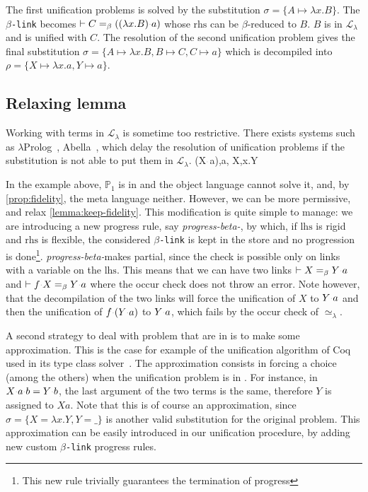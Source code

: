 \documentclass[sigconf,natbib=false,review]{acmart}
\newcommand{\appsep}{\ensuremath{\textcolor{lightgray}{\cdot}}}
\newcommand{\UnifRel}{\ensuremath{\simeq}}
\newcommand{\Ue}{\ensuremath{\UnifRel_\lambda}\xspace}
\newcommand{\llambda}{\ensuremath{\mathcal{L}_\lambda}\xspace}
\newcommand{\linkMacro}[1]{\ensuremath{#1}\texttt{-link}\xspace}
\newcommand{\linkbeta}{\linkMacro{\beta}}
\newcommand{\linkbetaM}[3]{\ensuremath{#1 \vdash #2 =_\beta #3}}
\newcommand{\lhs}{\ensuremath{\mathrm{lhs}}\xspace}
\newcommand{\rhs}{\ensuremath{\mathrm{rhs}}\xspace}
\newcommand{\foUnifPb}{\ensuremath{\mathbb{P}}\xspace}
\begin{document}
The first unification problems is solved by the substitution $\sigma = \{A
\mapsto \lambda x.B\}$. The \linkbeta becomes
\linkbetaM{}{C}{((\lambda x.B) \appsep a)} whose \rhs can be $\beta$-reduced to
$B$. $B$ is in \llambda and is unified with $C$. The resolution of the second
unification problem
gives the final substitution $\sigma = \{A \mapsto \lambda x.B, B \mapsto C, C
\mapsto a\}$ which is decompiled into $\rho = \{X \mapsto \lambda x.a, Y \mapsto
a\}$.
 
\subsection{Relaxing lemma }

\newcommand{\progBetaNoLLWait}{\emph{progress-beta-\notllambda}}

Working with terms in \llambda is sometime too restrictive. There exists systems
such as $\lambda$Prolog~\cite{lamProlog}, Abella~\cite{gacek2008abella}, which 
delay the resolution of \notllambda unification problems if the substitution
is not able to put them in \llambda.
%
\printAlll
  {{{(X\appsep a),a},
    {X,\lambda x.Y}}}
  {{}}
  {{}}
  {{}}

In the example above, $\foUnifPb_1$ is in \notllambda and the object language
cannot solve it, and, by \cref{prop:fidelity}, the meta language neither.
However, we can be more permissive, and relax \cref{lemma:keep-fidelity}. This
modification is quite simple to manage: we are introducing a new \notllambda
progress rule, say \progBetaNoLLWait, by which, if \lhs is rigid and \rhs is
flexible, the considered \linkbeta is kept in the store and no progression is
done\footnote{This new rule trivially guarantees the termination of progress}.
\progBetaNoLLWait makes  partial, since the check is
possible only on links with a variable on the \lhs. This means that we can have
two links \linkbetaM{}{X}{Y\appsep a} and \linkbetaM{}{f\appsep X}{Y\appsep a}
where the occur check does not throw an error. Note however, that the
decompilation of the two links will force the unification of $X$ to $Y\appsep a$
and then the unification of $f\appsep (Y \appsep a)$ to $Y\appsep a$, which
fails by the occur check of \Ue.

A second strategy to deal with problem that are in \notllambda is to make some
approximation. This is the case for example of the unification algorithm of Coq
used in its type class solver~\cite{sozeau08}. The approximation consists in
forcing a choice (among the others) when the unification problem is in
\notllambda. For instance, in $X \appsep a \appsep b = Y \appsep b$, the last
argument of the two terms is the same, therefore $Y$ is assigned to $X a$. Note
that this is of course an approximation, since $\sigma = \{X = \lambda x.Y, Y =
\_\}$ is another valid substitution for the original problem. This approximation
can be easily introduced in our unification procedure, by adding new custom 
\linkbeta progress rules.
\end{document}
